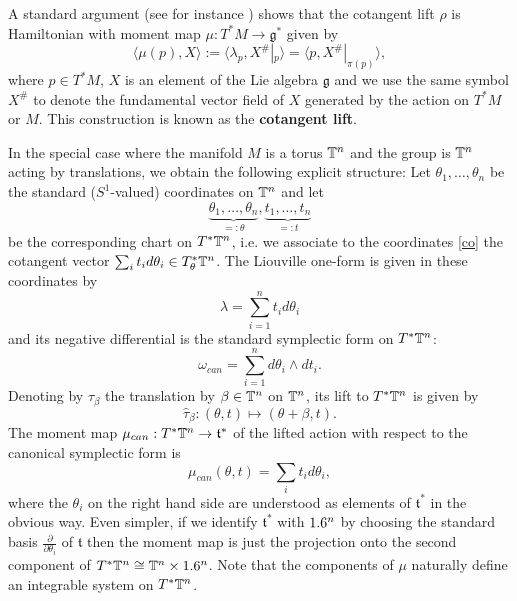 A standard argument (see for instance \cite{GS90}) shows that the cotangent lift $\hat{\rho}$  is Hamiltonian with moment map $\mu:T^*M \to \mathfrak{g}^*$ given by
\begin{equation*}\label{eqn:lift}
\langle\mu(p),X \rangle := \langle \lambda_p ,X^\#|_{p} \rangle =\langle p,X^\#|_{\pi(p)}\rangle,
\end{equation*}
where  $p\in T^*M$, $X$ is an element of the Lie algebra $\mathfrak{g}$ and we use the same symbol $X^\#$ to denote the fundamental vector field of $X$ generated by the action on $T^\ast M$ or $M$.
This  construction is known  as the {\bf cotangent lift}.

 In the special case where the manifold $M$ is a torus $\mathbb{T}^n$ and the group is $\mathbb{T}^n$ acting by translations, we obtain the following explicit structure: Let $\theta_1,\ldots,\theta_n$  be the standard ($S^1$-valued) coordinates on $\mathbb{T}^n$ and let
\begin{equation}\label{co}
\underbrace{\theta_1,\ldots,\theta_n}_{=:\theta}, \underbrace{t_1, \ldots, t_n}_{=:t}
\end{equation}
be the corresponding chart on $T^\ast \mathbb{T}^n$, i.e. we associate to the coordinates \eqref{co} the cotangent vector $\sum_i t_i d \theta_i \in T^\ast_\theta \mathbb{T}^n$.
The Liouville one-form is given in these coordinates by
$$ \lambda = \sum_{i=1}^n t_i d \theta_i $$
and its negative differential is the standard symplectic form on $T^\ast \mathbb{T}^n$:
\begin{equation}\label{eq:omegacan}
\omega_{can} = \sum_{i=1}^n d \theta_i \wedge d t_i .
\end{equation}
%
Denoting by $\tau_\beta$ the translation by $\beta \in \mathbb{T}^n$ on $\mathbb{T}^n$, its lift to $T^\ast \mathbb{T}^n$ is given by
$$ \hat \tau_\beta: (\theta, t) \mapsto (\theta + \beta, t).$$
The moment map $\mu_{can}: T^\ast \mathbb{T}^n \to \mathfrak{t^\ast} $ of the lifted action with respect to the canonical symplectic form is
\begin{equation}\label{eq:mucan}
\mu_{can}(\theta,t) = \sum_i t_i d\theta_i,
\end{equation}
where the $\theta_i$ on the right hand side are understood as elements of $ \mathfrak{t^\ast}$ in the obvious way. Even simpler, if we identify $ \mathfrak{t^\ast}$ with $1.6^n$ by choosing the standard basis $\frac{\partial}{\partial \theta_i}$ of  $\mathfrak{t}$ then the moment map is just the projection onto the second component of $T^\ast \mathbb{T}^n \cong \mathbb{T}^n \times 1.6^n$.  Note that the components of $\mu$ naturally define an integrable system on $T^\ast \mathbb{T}^n$.


